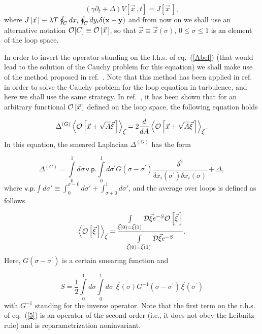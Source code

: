 \documentclass[a4paper,12pt]{article}
\begin{document}
\begin{equation}
\label{Abel}
\left(\gamma\partial_t+\Delta\right)V\left[\vec x{\,},t\right]=J\left[{\vec x}{\,}\right],
\end{equation}
where $J\left[\vec x{\,}\right]\equiv\lambda T\oint_{C}^{}dx_i\oint_{C}^{}dy_i\delta({\bf x}-{\bf y})$ and from now on we shall use
an alternative notation ${\cal O}[C]\equiv{\cal O}\left[\vec x{\,}\right]$, so that $\vec x\equiv\vec x(\sigma)$, $0\le\sigma\le 1$
is an element of the loop space.

In order to invert the operator standing on the l.h.s. of eq.~(\ref{Abel}) (that would lead to
the solution of the Cauchy problem for this equation) we
shall make use of the method proposed
in ref.~\cite{lapl}. Note that this method has been applied in ref.~\cite{tur2} in order to solve the Cauchy problem for the
loop equation in turbulence, and here we shall use the same strategy.
In ref.~\cite{lapl}, it has been shown that for an arbitrary functional ${\cal O}\left[\vec x{\,}\right]$
defined on the loop space, the following equation holds

\begin{equation}
\label{4}
\Delta^{(G)}\left<{\cal O}\left[\vec x+\sqrt{A}\vec\xi{\,}\right]\right>_{\vec\xi}=
2\frac{d}{dA}\left<{\cal O}\left[\vec x+\sqrt{A}\vec\xi{\,}\right]\right>_{\vec\xi}.
\end{equation}
In this equation, the smeared Laplacian $\Delta^{(G)}$ has the form

\begin{equation}
\label{5}
\Delta^{(G)}=\int\limits_0^1 d\sigma{\,} \textsf{v.p.}\int\limits_0^1 d\sigma^\prime
G\left(\sigma-\sigma^\prime\right)\frac{\delta^2}{\delta x_i\left(
\sigma^\prime\right)
\delta x_i\left(\sigma\right)}+\Delta,
\end{equation}
where $\textsf{v.p.}\int d\sigma'\equiv
\int_{0}^{\sigma-0}d\sigma'+
\int_{\sigma+0}^{1}d\sigma'$,
and the average over loops is defined as follows

\begin{equation}
\label{average}
\left<{\cal O}\left[\vec \xi{\,}\right]\right>_{\vec\xi}=
\frac{\int\limits_{\vec\xi(0)=
\vec\xi(1)}^{}{\cal D}\vec\xi e^{-S}{\cal O}\left[\vec\xi{\,}\right]}
{\int\limits_{\vec
\xi(0)=\vec\xi(1)}^{}{\cal D}\vec\xi e^{-S}}.
\end{equation}
Here, $G\left(\sigma-\sigma^\prime\right)$ is a certain smearing function and

\begin{equation}
\label{6}
S=\frac{1}{2}\int\limits_0^1 d\sigma\int\limits_0^1 d\sigma^
\prime\vec\xi\left(\sigma\right)G^{-1}\left(\sigma-\sigma^\prime
\right)\vec\xi\left(\sigma^
\prime\right)
\end{equation}
with $G^{-1}$ standing for the inverse operator.
Note that the first term on the r.h.s. of eq.~(\ref{5}) is an operator of the second
order (i.e., it does not obey the Leibnitz rule) and is reparametrization noninvariant.
\end{document}
